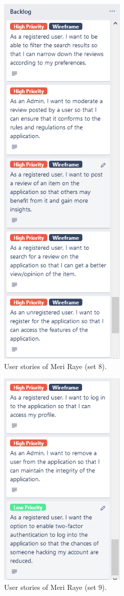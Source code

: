 \documentclass[11pt]{extarticle}
\begin{document}
\begin{center}
    \begin{figure}[H]
        \centering
        \includegraphics[width=2.4in]{Figures/user_stories_8.png}
        \caption{User stories of Meri Raye (set 8).}
    \end{figure}
\end{center}

\begin{center}
    \begin{figure}[H]
        \centering
        \includegraphics[width=2.4in]{Figures/user_stories_9.png}
        \caption{User stories of Meri Raye (set 9).}
    \end{figure}
\end{center}
\end{document}

